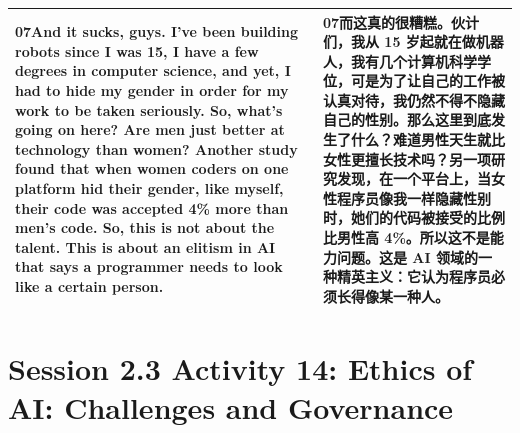 \documentclass[UTF8,zihao=-4,fontset=fandol]{ctexart}
\newcommand{\TranscriptColumn}{\raggedright\arraybackslash\hyphenpenalty=10000\exhyphenpenalty=10000\sloppy}
\begin{document}
\begin{longtable}{>{\TranscriptColumn}p{} >{\TranscriptColumn}p{}}
\textbf{07}\quad And it sucks, guys. I've been building robots since I was 15, I have a few degrees in computer science, and yet, I had to hide my gender in order for my work to be taken seriously. So, what's going on here? Are men just better at technology than women? Another study found that when women coders on one platform hid their gender, like myself, their code was accepted 4\% more than men's code. So, this is not about the talent. This is about an elitism in AI that says a programmer needs to look like a certain person. & \textbf{07}\quad 而这真的很糟糕。伙计们，我从 15 岁起就在做机器人，我有几个计算机科学学位，可是为了让自己的工作被认真对待，我仍然不得不隐藏自己的性别。那么这里到底发生了什么？难道男性天生就比女性更擅长技术吗？另一项研究发现，在一个平台上，当女性程序员像我一样隐藏性别时，她们的代码被接受的比例比男性高 4\%。所以这不是能力问题。这是 AI 领域的一种精英主义：它认为程序员必须长得像某一种人。 \\ \hline
\end{longtable}


\clearpage
\section{Session 2.3 Activity 14: Ethics of AI: Challenges and Governance}
\end{document}
